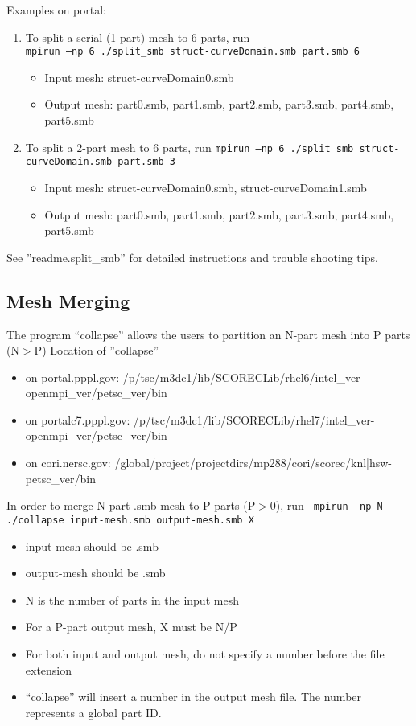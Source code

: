Examples on portal:
\begin{enumerate}
\item To split a serial (1-part) mesh to 6 parts, run\\
 \texttt{mpirun –np 6 ./split\_smb struct-curveDomain.smb part.smb 6}
\begin{itemize}
\item	Input mesh: struct-curveDomain0.smb 
\item	Output mesh: part0.smb, part1.smb, part2.smb, part3.smb, part4.smb, part5.smb
\end{itemize}

\item To split a 2-part mesh to 6 parts, run
 \texttt{mpirun –np 6 ./split\_smb  struct-curveDomain.smb part.smb 3}
\begin{itemize}
\item	Input mesh: struct-curveDomain0.smb, struct-curveDomain1.smb
\item	Output mesh: part0.smb, part1.smb, part2.smb, part3.smb, part4.smb, part5.smb
\end{itemize}
\end{enumerate}

See ”readme.split\_smb” for detailed instructions and trouble shooting tips.


\subsection{Mesh Merging}

The program “collapse” allows the users to partition an N-part mesh into P parts (N$>$P)
\newline\newline
Location of ”collapse”
\begin{itemize}
\item	on portal.pppl.gov: \newline
/p/tsc/m3dc1/lib/SCORECLib/rhel6/intel\_ver-openmpi\_ver/petsc\_ver/bin
\item	on portalc7.pppl.gov: \newline
/p/tsc/m3dc1/lib/SCORECLib/rhel7/intel\_ver-openmpi\_ver/petsc\_ver/bin
\item	on cori.nersc.gov: \newline
 /global/project/projectdirs/mp288/cori/scorec/knl|hsw-petsc\_ver/bin
\end{itemize}

In order to merge N-part .smb mesh to P parts (P$>$0), run
\texttt{
	mpirun –np N ./collapse input-mesh.smb output-mesh.smb X 
}
\begin{itemize}
\item	input-mesh should be .smb 
\item	output-mesh should be .smb
\item	N is the number of parts in the input mesh
\item	For a P-part output mesh, X must be N/P
\item	For both input and output mesh, do not specify a number before the file extension
\item	“collapse” will insert a number in the output mesh file. The number represents a global part ID.
\end{itemize}

